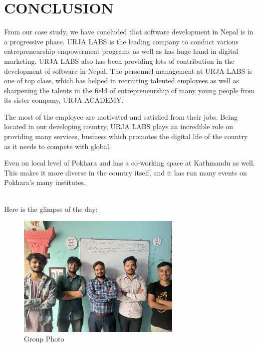 \chapter{CONCLUSION}

From our case study, we have concluded that software development in Nepal is in a progressive phase. URJA LABS is the leading company to conduct various entrepreneurship empowerment programs as well as has huge hand in digital marketing. URJA LABS also has been providing lots of contribution in the development of software in Nepal. The personnel management at URJA LABS is one of top class, which has helped in recruiting talented employees as well as sharpening the talents in the field of entrepreneurship of many young people from its sister company, URJA ACADEMY.

The most of the employee are motivated and satisfied from their jobs.
Being located in our developing country, URJA LABS plays an incredible role on providing many services, business which promotes the digital life of the country as it needs to compete with global.

Even on local level of Pokhara and has a co-working space at Kathmandu as well. This makes it more diverse in the country itself, and it has run many events on Pokhara's many institutes. 

\\

Here is the glimpse of the day: 
\begin{figure}[h]
        \centering  
        \includegraphics[width=0.7\textwidth]{Graphics/group_photo.jpg}
        \caption[Group Photo]{Group Photo}
        \label{fig:Group Photo}
    \end{figure}

